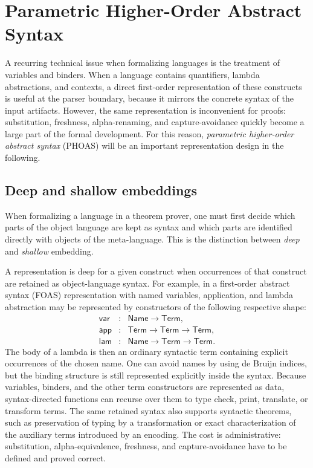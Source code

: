 \section{Parametric Higher-Order Abstract Syntax}
\label{sec:phoas}

A recurring technical issue when formalizing languages is the treatment of variables and binders.
When a language contains quantifiers, lambda abstractions, and contexts, a direct
first-order representation of these constructs is useful at the parser boundary, because it mirrors
the concrete syntax of the input artifacts.
However, the same representation is inconvenient for proofs: substitution, freshness, alpha-renaming,
and capture-avoidance quickly become a large part of the formal development.
For this reason, \emph{parametric higher-order abstract syntax} (PHOAS) will be an important
representation design in the following.

\subsection{Deep and shallow embeddings}

When formalizing a language in a theorem prover, one must first decide which parts of the object language are kept as syntax and which parts are identified directly with objects of the meta-language.
This is the distinction between \emph{deep} and \emph{shallow} embedding.

A representation is deep for a given construct when occurrences of that construct are retained as object-language syntax.
For example, in a first-order abstract syntax (FOAS) representation with named variables, application, and lambda abstraction may be represented by constructors of the following respective shape:
\[
\begin{array}{rcl}
  \mathsf{var} &:& \mathsf{Name} \to \mathsf{Term},\\
  \mathsf{app} &:& \mathsf{Term} \to \mathsf{Term} \to \mathsf{Term},\\
  \mathsf{lam} &:& \mathsf{Name} \to \mathsf{Term} \to \mathsf{Term}.
\end{array}
\]
The body of a lambda is then an ordinary syntactic term containing explicit occurrences of the chosen name.
One can avoid names by using de Bruijn indices, but the binding structure is still represented explicitly inside the syntax.
Because variables, binders, and the other term constructors are represented as data, syntax-directed functions can recurse over them to type check, print, translate, or transform terms.
The same retained syntax also supports syntactic theorems, such as preservation of typing by a transformation or exact characterization of the auxiliary terms introduced by an encoding.
The cost is administrative: substitution, alpha-equivalence, freshness, and capture-avoidance have to be defined and proved correct.

